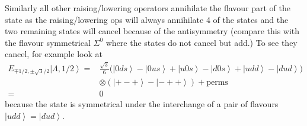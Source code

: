 \documentclass[main.tex]{subfiles}
\begin{document}
Similarly all other raising/lowering operators annihilate the flavour part of the state as the raising/lowering ops will always annihilate 4 of the states and the two remaining states will cancel because of the antisymmetry (compare this with the flavour symmetrical $\Sigma^0$ where the states do not cancel but add.) 
To see they cancel, for example look at
\begin{align}
E_{\mp1/2,\pm\sqrt{3}/2}\left|\Lambda,1/2\right>=&\frac{\sqrt{3}}{6}\Big(\left|0ds\right>-\left|0us\right>+\left|u0s\right>-\left|d0s\right>+\left|udd\right>-\left|dud\right>\Big)\\&\otimes(\left|+-+\right>-\left|-++\right>) + \text{perms}\\
=&0
\end{align}
because the state is symmetrical under the interchange of a pair of flavours $\left|udd\right>=\left|dud\right>$.
\end{document}
